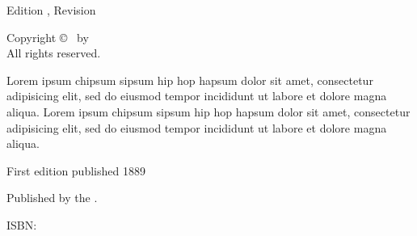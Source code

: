 
\clearpage

\begingroup
  \null\vfill
  \begin{center}
  \utitle\par
  Edition \uedition, Revision \urevision\par
  Copyright \copyright{} \udate\ by \uauthor\\
  All rights reserved.\par

  Lorem ipsum chipsum sipsum hip hop hapsum dolor sit amet, consectetur adipisicing elit, sed do eiusmod tempor incididunt ut labore et dolore magna aliqua. Lorem ipsum chipsum sipsum hip hop hapsum dolor sit amet, consectetur adipisicing elit, sed do eiusmod tempor incididunt ut labore et dolore magna aliqua.\par
  
  First edition published 1889\par
  Published by the \upublisher.\par
  ISBN: \uisbn\par

  \uwebsite
  \end{center}
  \vspace*{10mm}
\endgroup

\clearpage